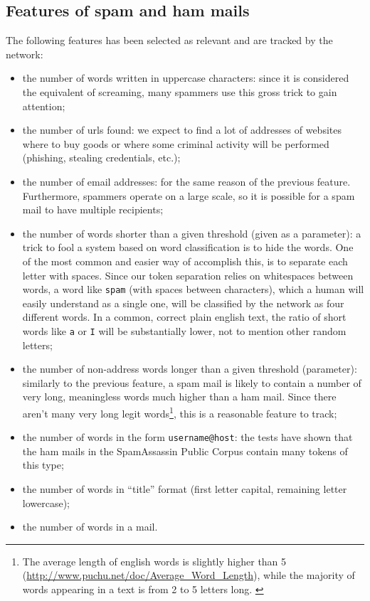 \subsection{Features of spam and ham mails}
\label{featuresused} The following features has been selected as relevant and are tracked by the network:
\begin{itemize}[noitemsep]
  \item the number of words written in uppercase characters: since it is considered the equivalent of screaming, many spammers use this gross trick to gain attention;
  \item the number of urls found: we expect to find a lot of addresses of websites where to buy goods or where some criminal activity will be performed (phishing, stealing credentials, etc.);
  \item the number of email addresses: for the same reason of the previous feature. Furthermore, spammers operate on a large scale, so it is possible for a spam mail to have multiple recipients;
  \item the number of words shorter than a given threshold (given as a parameter): a trick to fool a system based on word classification is to hide the words. One of the most common and easier way of accomplish this, is to separate each letter with spaces. Since our token separation relies on whitespaces between words, a word like \texttt{s\textvisiblespace p\textvisiblespace a\textvisiblespace m} (with spaces between characters), which a human will easily understand as a single one, will be classified by the network as four different words. In a common, correct plain english text, the ratio of short words like \verb!a! or \verb!I! will be substantially lower, not to mention other random letters;
  \item the number of non-address words longer than a given threshold (parameter): similarly to the previous feature, a spam mail is likely to contain a number of very long, meaningless words much higher than a ham mail. Since there aren't many very long legit words\footnote{The average length of english words is slightly higher than 5 (\url{http://www.puchu.net/doc/Average_Word_Length}), while the majority of words appearing in a text is from 2 to 5 letters long. \citep{STUL:STUL109}}, this is a reasonable feature to track;
  \item the number of words in the form \verb!username@host!: the tests have shown that the ham mails in the SpamAssassin Public Corpus contain many tokens of this type;
  \item the number of words in ``title'' format (first letter capital, remaining letter lowercase);
  \item the number of words in a mail.
\end{itemize}

